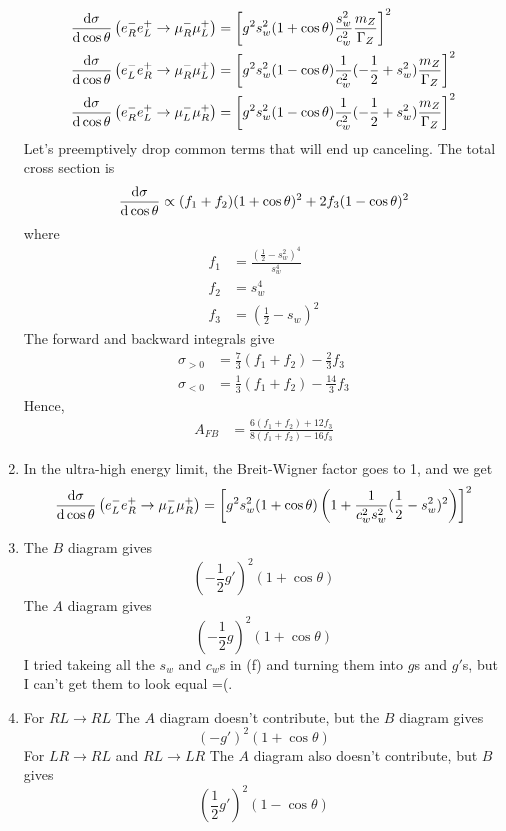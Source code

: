 \documentclass[12pt]{article}
\begin{document}
\begin{enumerate}[label=(\alph*)]
\begin{align*}
        \dv{\sigma}{\cos\theta}\left(e_R^-e_L^+\to\mu_R^-\mu_L^+\right) &= \left[g^2s_w^2(1 + \cos\theta)\frac{s_w^2}{c_w^2}\frac{m_Z}{\Gamma_Z} \right]^2 \\
        \dv{\sigma}{\cos\theta}\left(e_L^-e_R^+\to\mu_R^-\mu_L^+\right) &= \left[g^2s_w^2(1 - \cos\theta)\frac{1}{c_w^2}(-\frac{1}{2}+s_w^2)\frac{m_Z}{\Gamma_Z} \right]^2 \\
        \dv{\sigma}{\cos\theta}\left(e_R^-e_L^+\to\mu_L^-\mu_R^+\right) &= \left[g^2s_w^2(1 - \cos\theta)\frac{1}{c_w^2}(-\frac{1}{2}+s_w^2)\frac{m_Z}{\Gamma_Z} \right]^2
    \end{align*}
    Let's preemptively drop common terms that will end up canceling. The total cross section is
    \[ \dv{\sigma}{\cos\theta} \propto (f_1 + f_2)(1  + \cos\theta)^2 + 2f_3(1-\cos\theta)^2 \]
    where
    \begin{align*}
        f_1 &= \frac{\left(\frac{1}{2} - s_w^2\right)^4}{s_w^4} \\
        f_2 &= s_w^4 \\
        f_3 &= \left(\frac{1}{2} - s_w\right)^2
    \end{align*}
    The forward and backward integrals give
    \begin{align*}
        \sigma_{>0} &= \frac{7}{3}(f_1 + f_2) - \frac{2}{3}f_3 \\
        \sigma_{<0} &= \frac{1}{3}(f_1 + f_2) - \frac{14}{3}f_3
    \end{align*}
    Hence,
    \begin{align*}
        A_{FB} &= \frac{6(f_1 + f_2) + 12f_3}{8(f_1 + f_2)-16f_3}
    \end{align*}
    \item In the ultra-high energy limit, the Breit-Wigner factor goes to 1, and we get
    \[ \dv{\sigma}{\cos\theta}\left(e_L^-e_R^+\to\mu_L^-\mu_R^+\right) = \left[g^2s_w^2(1 + \cos\theta)\left(1 + \frac{1}{c_w^2s_w^2}(\frac{1}{2}-s_w^2)^2\right)\right]^2 \]
    \item The $B$ diagram gives 
    \[ (-\frac{1}{2}g')^2(1 + \cos\theta) \]
    The $A$ diagram gives 
    \[ (-\frac{1}{2}g)^2(1 + \cos\theta) \]
    I tried takeing all the $s_w$ and $c_w$s in (f) and turning them into $g$s and $g'$s, but I can't get them to look equal =(.
    \item For $RL\to RL$ The $A$ diagram doesn't contribute, but the $B$ diagram gives
    \[ (-g')^2(1 + \cos\theta) \]
    For $LR\to RL$ and $RL \to LR$ The $A$ diagram also doesn't contribute, but $B$ gives
    \[ (\frac{1}{2}g')^2(1 - \cos\theta) \] 
\end{enumerate}
\end{document}
